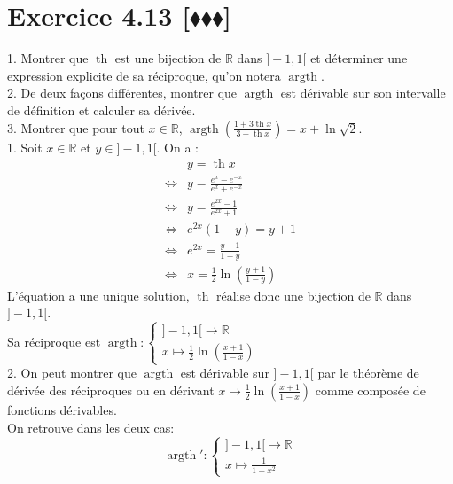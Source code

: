 \documentclass[10pt]{article}
\DeclareMathOperator{\tah}{th}
\DeclareMathOperator{\argth}{argth}
\begin{document}
\section*{Exercice 4.13 [$\blacklozenge\blacklozenge\blacklozenge$]}
\begin{tcolorbox}[enhanced, width=7in, center, size=fbox, fontupper=\large, drop shadow southwest]
    1. Montrer que $\tah$ est une bijection de $\mathbb{R}$ dans $\rbrack-1,1\lbrack$ et déterminer une expression explicite de sa réciproque, qu'on notera $\argth$.\\
    2. De deux façons différentes, montrer que $\argth$ est dérivable sur son intervalle de définition et calculer sa dérivée.\\
    3. Montrer que pour tout $x\in\mathbb{R}$, $\argth\left(\frac{1+3\tah x}{3+\tah x}\right)=x+\ln\sqrt{2}$.\\[0.25cm]
    1. Soit $x\in\mathbb{R}$ et $y\in\rbrack-1,1\lbrack$. On a :
    \begin{align*}
        &y=\tah x\\
        \iff& y=\frac{e^x-e^{-x}}{e^x+e^{-x}}\\
        \iff& y=\frac{e^{2x}-1}{e^{2x}+1}\\
        \iff& e^{2x}(1-y)=y+1\\
        \iff &e^{2x}=\frac{y+1}{1-y}\\
        \iff &x=\frac{1}{2}\ln\left(\frac{y+1}{1-y}\right)
    \end{align*}
    L'équation a une unique solution, $\tah$ réalise donc une bijection de $\mathbb{R}$ dans $\rbrack-1,1\lbrack$.\\
    Sa réciproque est $\argth:\begin{cases}\rbrack-1,1\lbrack\rightarrow\mathbb{R}\\x\mapsto\frac{1}{2}\ln\left(\frac{x+1}{1-x}\right)\end{cases}$\\[0.25cm]
    2. On peut montrer que $\argth$ est dérivable sur $]-1,1[$ par le théorème de dérivée des réciproques ou en dérivant $x\mapsto\frac{1}{2}\ln\left(\frac{x+1}{1-x}\right)$ comme composée de fonctions dérivables.\\
    On retrouve dans les deux cas:
    \begin{equation*}
        \argth':\begin{cases}]-1,1[\rightarrow\mathbb{R}\\x\mapsto\frac{1}{1-x^2}\end{cases}
    \end{equation*}

\end{tcolorbox}
\end{document}
